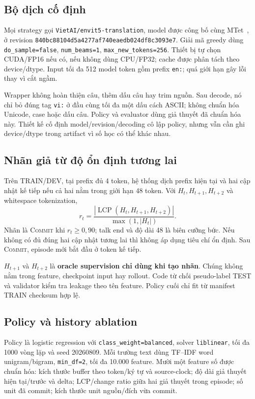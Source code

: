 \documentclass[conference]{IEEEtran}
\newcommand{\commit}{\ifmmode\mathrm{COMMIT}\else\textsc{Commit}\fi}
\newcommand{\lcp}{\operatorname{LCP}}
\begin{document}
\subsection{Bộ dịch cố định}
Mọi strategy gọi \texttt{VietAI/envit5-translation}, model được công bố cùng MTet~\cite{ngo2022mtet}, ở revision \texttt{840bc88104d5a4277af740eaedb024df8c3093e7}. Giải mã greedy dùng \texttt{do\_sample=false}, \texttt{num\_beams=1}, \texttt{max\_new\_tokens=256}. Thiết bị tự chọn CUDA/FP16 nếu có, nếu không dùng CPU/FP32; cache được phân tách theo device/dtype. Input tối đa 512 model token gồm prefix \texttt{en:}; quá giới hạn gây lỗi thay vì cắt ngầm.

Wrapper không hoàn thiện câu, thêm dấu câu hay trim nguồn. Sau decode, nó chỉ bỏ đúng tag \texttt{vi:} ở đầu cùng tối đa một dấu cách ASCII; không chuẩn hóa Unicode, case hoặc dấu câu. Policy và evaluator dùng giả thuyết đã chuẩn hóa này. Thiết kế cố định model/revision/decoding cô lập policy, nhưng vẫn cần ghi device/dtype trong artifact vì số học có thể khác nhau.

\subsection{Nhãn giả từ độ ổn định tương lai}
Trên TRAIN/DEV, tại prefix đủ 4 token, hệ thống dịch prefix hiện tại và hai cập nhật kế tiếp nếu cả hai nằm trong giới hạn 48 token. Với $H_t,H_{t+1},H_{t+2}$ và whitespace tokenization,
\begin{equation}
r_t=\frac{|\lcp(H_t,H_{t+1},H_{t+2})|}{\max(1,|H_t|)}.
\label{eq:stability}
\end{equation}
Nhãn là \commit{} khi $r_t\geq0{,}90$; talk end và độ dài 48 là biên cưỡng bức. Nếu không có đủ đúng hai cập nhật tương lai thì không áp dụng tiêu chí ổn định. Sau \commit, episode mới bắt đầu ở token kế tiếp.

$H_{t+1}$ và $H_{t+2}$ là \textbf{oracle supervision chỉ dùng khi tạo nhãn}. Chúng không nằm trong feature, checkpoint input hay rollout. Code từ chối pseudo-label TEST và validator kiểm tra leakage theo tên feature. Policy cuối chỉ fit từ manifest TRAIN checksum hợp lệ.

\subsection{Policy và history ablation}
Policy là logistic regression với \texttt{class\_weight=balanced}, solver \texttt{liblinear}, tối đa 1000 vòng lặp và seed 20260809. Mỗi trường text dùng TF--IDF word unigram/bigram, \texttt{min\_df=2}, tối đa 10.000 feature. Mười một feature số được chuẩn hóa: kích thước buffer theo token/ký tự và source-clock; độ dài giả thuyết hiện tại/trước và delta; LCP/change ratio giữa hai giả thuyết trong episode; số unit đã commit; kích thước unit nguồn/đích vừa commit.
\end{document}
